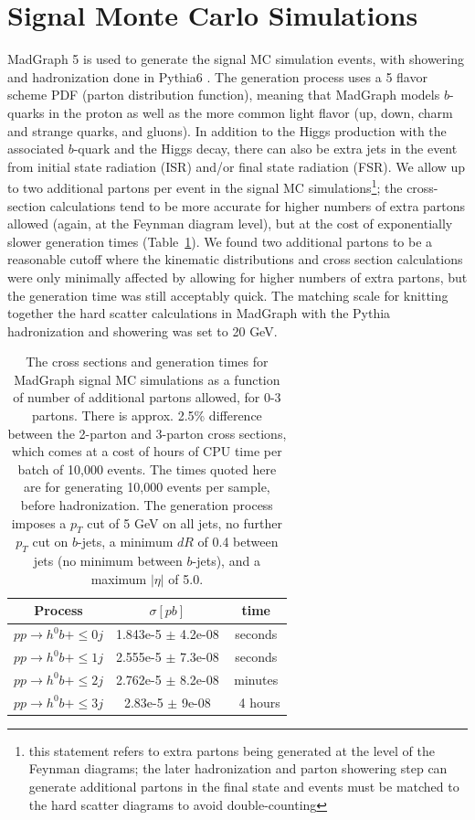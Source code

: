 \section{Signal Monte Carlo Simulations}
MadGraph 5 \cite{MadGraph} is used to generate the signal MC simulation events, with showering and 
hadronization done in Pythia6 \cite{Pythia6}.  The generation process uses a 5 flavor scheme PDF 
(parton distribution function), meaning that MadGraph models $b$-quarks in the proton as 
well as the more common light flavor (up, down, charm and strange quarks, 
and gluons).  In addition to the Higgs production with the associated $b$-quark and 
the Higgs decay, there can also be extra jets in the event from initial state radiation (ISR) 
and/or final state radiation (FSR).  We allow up to two additional partons per 
event in the signal MC simulations\footnote{this statement refers to extra partons being
generated at the level of the Feynman diagrams; the later hadronization and parton showering step can generate additional
partons in the final state and events must be matched to the hard scatter diagrams to avoid double-counting}; 
the cross-section calculations tend to be more 
accurate for higher numbers of extra partons allowed (again, at the Feynman diagram level), 
but at the cost of exponentially slower 
generation times (Table~\ref{tab:mg_times}).  We found two additional partons to be a reasonable cutoff where the kinematic
distributions and cross section calculations were only minimally 
affected by allowing for higher numbers of extra partons, but the generation 
time was still acceptably quick.  The matching scale for knitting together the hard scatter
calculations in MadGraph with the Pythia hadronization and showering was set to 20 GeV.

\begin{table}
   \caption{The cross sections and generation times for MadGraph signal MC simulations as a function
   of number of additional partons allowed, for 0-3 partons.  There is approx. 2.5\%
   difference between the 2-parton and 3-parton cross sections, which comes at a cost
   of hours of CPU time per batch of 10,000 events.  The times quoted here are for generating 10,000 events per 
   sample, before hadronization.  The generation process imposes a $p_T$ cut of 5 GeV on all jets,
   no further $p_T$ cut on $b$-jets, a minimum $dR$ of 0.4 between jets (no minimum between
   $b$-jets), and a maximum $|\eta|$ of 5.0. \label{tab:mg_times}} 
    \center
    \begin{tabular}{ c c c } \hline\hline
    Process & $\sigma [pb]$ & time \\ \hline
    $pp\rightarrow h^0b + \leq 0j$ & 1.843e-5 $\pm$ 4.2e-08 & seconds \\
    $pp\rightarrow h^0b + \leq 1j$ & 2.555e-5 $\pm$ 7.3e-08 & seconds \\
    $pp\rightarrow h^0b + \leq 2j$ & 2.762e-5 $\pm$ 8.2e-08 & minutes \\
    $pp\rightarrow h^0b + \leq 3j$ & 2.83e-5 $\pm$ 9e-08 & $~$ 4 hours \\  \hline
    \end{tabular}
\end{table}

